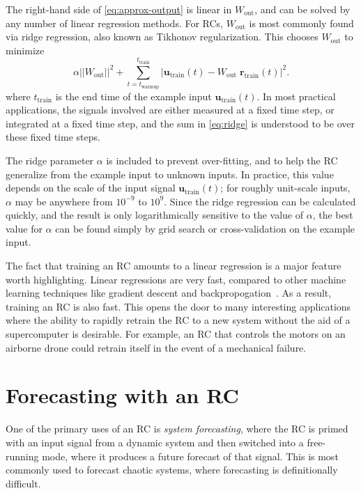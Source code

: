 The right-hand side of \cref{eq:approx-output} is linear in
$W_\text{out}$, and can be solved by any number of linear regression
methods. For RCs, $W_\text{out}$ is most commonly found via ridge
regression, also known as Tikhonov regularization. This chooses
$W_\text{out}$ to minimize
\begin{equation}
  \label{eq:ridge}
  \alpha ||W_\text{out}||^2 + \sum_{t = t_\text{warmup}}^{t_\text{train}} |\mathbf{u}_\text{train}(t) - W_\text{out}\;\mathbf{r}_\text{train}(t)|^2.
\end{equation}
where $t_\text{train}$ is the end time of the example input $\bm{u}_\text{train}(t)$.
In most practical applications, the signals involved are either
measured at a fixed time step, or integrated at a fixed time step, and
the sum in \cref{eq:ridge} is understood to be over these fixed time
steps.

The ridge parameter $\alpha$ is included to prevent over-fitting, and
to help the RC generalize from the example input to unknown inputs. In
practice, this value depends on the scale of the input signal
$\bm{u}_\text{train}(t)$; for roughly unit-scale inputs, $\alpha$ may be
anywhere from $10^{-9}$ to $10^9$. Since the ridge regression can be
calculated quickly, and the result is only logarithmically sensitive
to the value of $\alpha$, the best value for $\alpha$ can be found
simply by grid search or cross-validation on the example input.

The fact that training an RC amounts to a linear regression is a major
feature worth highlighting. Linear regressions are very fast, compared
to other machine learning techniques like gradient descent and
backpropogation~\cite{lukosevicius2009}. As a result, training an RC
is also fast. This opens the door to many interesting applications
where the ability to rapidly retrain the RC to a new system without the aid of
a supercomputer is desirable. For example, an RC that controls the
motors on an airborne drone could retrain itself in the event of a
mechanical failure.

\section{Forecasting with an RC}\label{sec:forecasting}

One of the primary uses of an RC is \emph{system forecasting}, where
the RC is primed with an input signal from a dynamic system and then
switched into a free-running mode, where it produces a future forecast
of that signal. This is most commonly used to forecast
chaotic systems, where forecasting is definitionally difficult.

